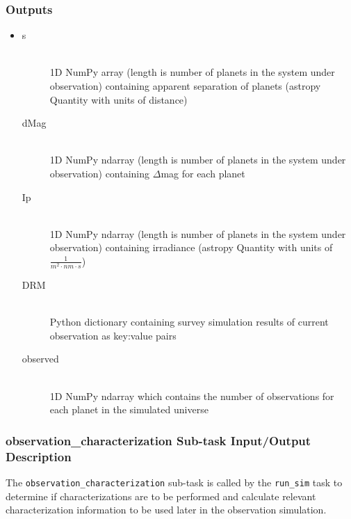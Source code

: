 \documentclass[cleanfoot]{asme2ej}
\begin{document}
\subsubsection*{Outputs}
\begin{itemize}
    \item 
    \begin{description}
        \item[s] \hfill \\
        1D NumPy array (length is number of planets in the system under observation) containing apparent separation of planets (astropy Quantity with units of distance)
        \item[dMag] \hfill \\
        1D NumPy ndarray (length is number of planets in the system under observation) containing $ \Delta $mag for each planet
        \item[Ip] \hfill \\
        1D NumPy ndarray (length is number of planets in the system under observation) containing irradiance (astropy Quantity with units of $ \frac{1}{m^2 \cdot nm \cdot s} $)
        \item[DRM] \hfill \\
        Python dictionary containing survey simulation results of current observation as key:value pairs
        \item[observed] \hfill \\
        1D NumPy ndarray which contains the number of observations for each planet in the simulated universe
    \end{description}
\end{itemize}

\subsubsection{observation\_characterization Sub-task Input/Output Description} \label{sec:observationcharacterizationtask}
The \verb+observation_characterization+ sub-task is called by the \verb+run_sim+ task to determine if characterizations are to be performed and calculate relevant characterization information to be used later in the observation simulation.
\end{document}
